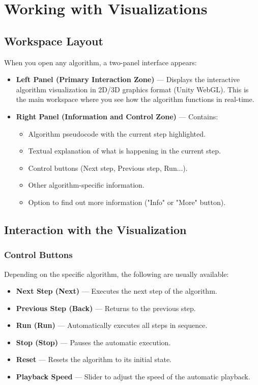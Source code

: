 \section{Working with Visualizations}

\subsection{Workspace Layout}

When you open any algorithm, a two-panel interface appears:

\begin{itemize}
  \item \textbf{Left Panel (Primary Interaction Zone)} — Displays the interactive algorithm visualization in 2D/3D graphics format (Unity WebGL). This is the main workspace where you see how the algorithm functions in real-time.
  \item \textbf{Right Panel (Information and Control Zone)} — Contains:
    \begin{itemize}
      \item Algorithm pseudocode with the current step highlighted.
      \item Textual explanation of what is happening in the current step.
      \item Control buttons (Next step, Previous step, Run...).
      \item Other algorithm-specific information.
      \item Option to find out more information ("Info" or "More" button).
    \end{itemize}
\end{itemize}

\subsection{Interaction with the Visualization}

\subsubsection{Control Buttons}
Depending on the specific algorithm, the following are usually available:
\begin{itemize}
  \item \textbf{Next Step (Next)} — Executes the next step of the algorithm.
  \item \textbf{Previous Step (Back)} — Returns to the previous step.
  \item \textbf{Run (Run)} — Automatically executes all steps in sequence.
  \item \textbf{Stop (Stop)} — Pauses the automatic execution.
  \item \textbf{Reset} — Resets the algorithm to its initial state.
  \item \textbf{Playback Speed} — Slider to adjust the speed of the automatic playback.
\end{itemize}


